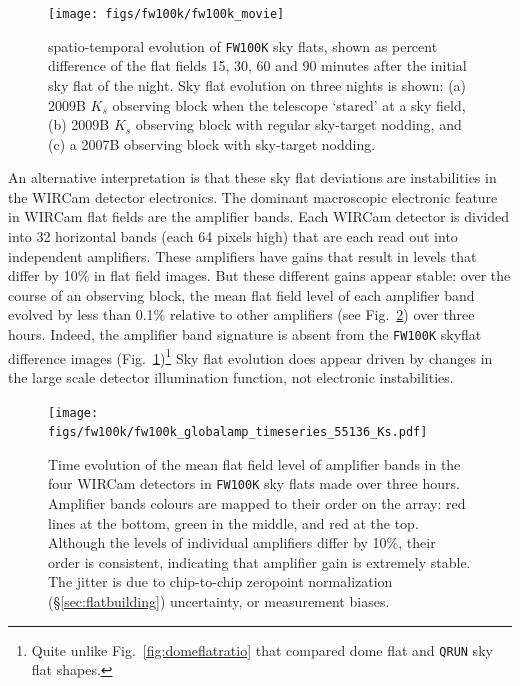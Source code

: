 \documentclass[iop]{emulateapj}
\newcommand{\Fig}[1]{Fig.~\ref{fig:#1}}  %
\newcommand{\Sec}[1]{\S\ref{sec:#1}}  %
\begin{document}
\begin{figure}[t]
\centering
\texttt{[image: figs/fw100k/fw100k\_movie]}
\caption{spatio-temporal evolution of \texttt{FW100K} sky flats, shown as percent difference of the flat fields 15, 30, 60 and 90 minutes after the initial sky flat of the night.
Sky flat evolution on three nights is shown: (a) 2009B $K_s$ observing block when the telescope `stared' at a sky field, (b) 2009B $K_s$ observing block with regular sky-target nodding, and (c) a 2007B observing block with sky-target nodding.}
\label{fig:fw100k_movie}
\end{figure}

An alternative interpretation is that these sky flat deviations are instabilities in the WIRCam detector electronics.
The dominant macroscopic electronic feature in WIRCam flat fields are the amplifier bands.
Each WIRCam detector is divided into 32 horizontal bands (each 64 pixels high) that are each read out into independent amplifiers.
These amplifiers have gains that result in levels that differ by 10\% in flat field images.
But these different gains appear stable: over the course of an observing block, the mean flat field level of each amplifier band evolved by less than 0.1\% relative to other amplifiers (see \Fig{fw100k_globalamp_timeseries_55136_Ks}) over three hours.
Indeed, the amplifier band signature is absent from the \texttt{FW100K} skyflat difference images (\Fig{fw100k_movie})\footnote{Quite unlike \Fig{domeflatratio} that compared dome flat and \texttt{QRUN} sky flat shapes.}
Sky flat evolution does appear driven by changes in the large scale detector illumination function, not electronic instabilities.

\begin{figure}[t]
\centering
\texttt{[image: figs/fw100k/fw100k\_globalamp\_timeseries\_55136\_Ks.pdf]}
\caption{Time evolution of the mean flat field level of amplifier bands in the four WIRCam detectors in \texttt{FW100K} sky flats made over three hours.
Amplifier bands colours are mapped to their order on the array: red lines at the bottom, green in the middle, and red at the top.
Although the levels of individual amplifiers differ by 10\%, their order is consistent, indicating that amplifier gain is extremely stable.
The jitter is due to chip-to-chip zeropoint normalization (\Sec{flatbuilding}) uncertainty, or measurement biases.}
\label{fig:fw100k_globalamp_timeseries_55136_Ks}
\end{figure}
\end{document}

